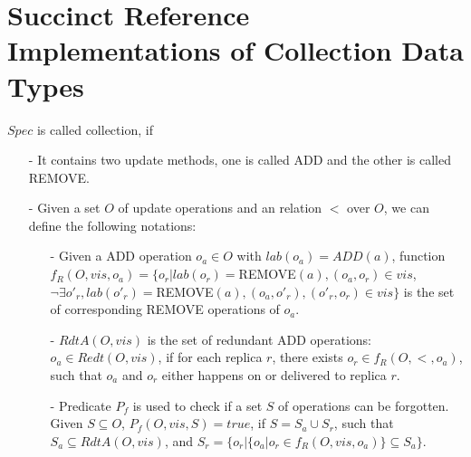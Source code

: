 
\section{Succinct Reference Implementations of Collection Data Types}
\label{sec:succinct reference implementations of collection data types}

$Spec$ is called collection, if

\begin{itemize}
\setlength{\itemsep}{0.5pt}
\item[-] It contains two update methods, one is called ADD and the other is called REMOVE.

\item[-] Given a set $O$ of update operations and an relation $<$ over $O$, we can define the following notations:

    \begin{itemize}
    \setlength{\itemsep}{0.5pt}
    \item[-] Given a ADD operation $o_a \in O$ with $lab(o_a)= ADD(a)$, function $f_R(O,\mathit{vis},o_a) = \{ o_r \vert lab(o_r)=$REMOVE$(a),(o_a,o_r) \in \mathit{vis}$, $ \neg \exists o'_r, lab(o'_r) = $REMOVE$(a), (o_a,o'_r),(o'_r,o_r) \in \mathit{vis} \}$ is the set of corresponding REMOVE operations of $o_a$. 

    \item[-] $RdtA(O,\mathit{vis})$ is the set of redundant ADD operations: $o_a \in Redt(O,\mathit{vis})$, if for each replica $r$, there exists $o_r \in f_R(O,<,o_a)$, such that $o_a$ and $o_r$ either happens on or delivered to replica $r$.

    \item[-] Predicate $P_f$ is used to check if a set $S$ of operations can be forgotten. Given $S \subseteq O$, $P_f(O,\mathit{vis},S) = \mathit{true}$, if $S = S_a \cup S_r$, such that $S_a \subseteq RdtA(O,\mathit{vis})$, and $S_r = \{ o_r \vert  \{ o_a \vert o_r \in f_R(O,\mathit{vis},o_a) \} \subseteq S_a \}$.
    \end{itemize}



\end{itemize}

